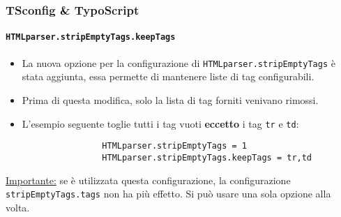 \begin{frame}[fragile]
	\frametitle{TSconfig \& TypoScript}
	\framesubtitle{\texttt{HTMLparser.stripEmptyTags.keepTags}}

	\lstset{basicstyle=\tiny\ttfamily}

	\begin{itemize}

		\item La nuova opzione per la configurazione di \texttt{HTMLparser.stripEmptyTags} è stata aggiunta,
			essa permette di mantenere liste di tag configurabili.
		\item Prima di questa modifica, solo la lista di tag forniti venivano rimossi.
		\item L'esempio seguente toglie tutti i tag vuoti \textbf{eccetto} i tag \texttt{tr} e \texttt{td}:

			\begin{lstlisting}
				HTMLparser.stripEmptyTags = 1
				HTMLparser.stripEmptyTags.keepTags = tr,td
			\end{lstlisting}

	\end{itemize}

	\underline{Importante:} se è utilizzata questa configurazione, la configurazione \texttt{stripEmptyTags.tags}
		non ha più effetto. Si può usare una sola opzione alla volta.

\end{frame}

